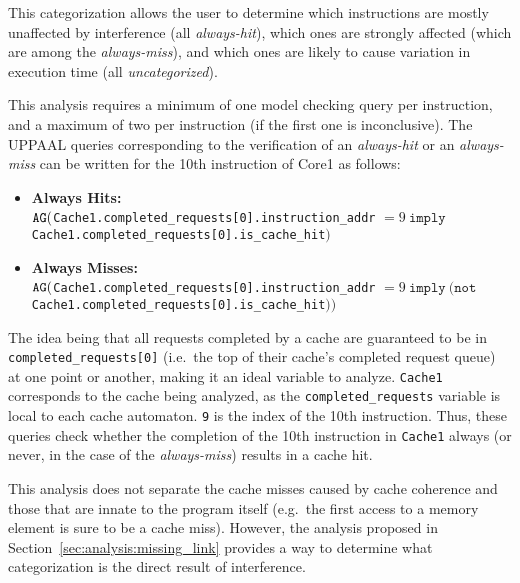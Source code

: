 This categorization allows the user to determine which instructions are
mostly unaffected by interference (all \textit{always-hit}), which ones are
strongly affected (which are among the \textit{always-miss}), and which ones are
likely to cause variation in execution time (all \textit{uncategorized}).

This analysis requires a minimum of one model checking query per instruction,
and a maximum of two per instruction (if the first one is
inconclusive). The UPPAAL queries corresponding to the verification of an
\textit{always-hit} or an \textit{always-miss} can be written for the
10th instruction of Core1 as follows:
\begin{itemize}
\item \textbf{Always Hits:}\\
$\text{\texttt{AG}}{}{}($\lstinline!Cache1.completed_requests[0].instruction_addr!
$= 9~\texttt{imply} $
\lstinline!Cache1.completed_requests[0].is_cache_hit!$)$
\item \textbf{Always Misses:}\\
$\text{\texttt{AG}}{}{}($\lstinline!Cache1.completed_requests[0].instruction_addr!
$= 9~\texttt{imply}~(\texttt{not} $
\lstinline!Cache1.completed_requests[0].is_cache_hit!$))$
\end{itemize}
The idea being that all requests completed by a cache are guaranteed to be in
\lstinline!completed_requests[0]! (i.e.~the top of their cache's completed
request queue) at one point or another, making it an ideal variable to analyze.
\lstinline!Cache1! corresponds to the cache being analyzed, as the
\lstinline!completed_requests! variable is local to each cache automaton.
\lstinline!9! is the index of the 10th instruction. Thus, these queries check
whether the completion of the 10th instruction in \lstinline!Cache1! always (or
never, in the case of the \textit{always-miss}) results in a cache hit.

This analysis does not separate the cache misses caused by cache coherence and
those that are innate to the program itself (e.g.~the first access to a memory
element is sure to be a cache miss). However, the analysis proposed in
Section~\ref{sec:analysis:missing_link} provides a way to determine what
categorization is the direct result of interference.

